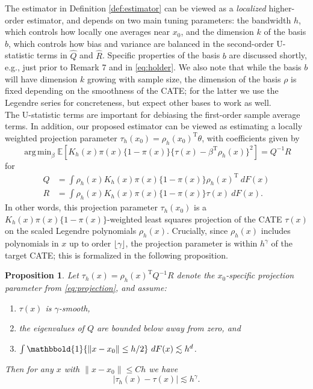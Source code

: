 \documentclass[11pt,twoside]{article}
\def\T{{ \mathrm{\scriptscriptstyle T} }}
\newcommand{\Pb}{\mathbb{P}}
\newcommand{\E}{\mathbb{E}}
\DeclareMathOperator*{\argmin}{arg\,min}
\newcommand{\one}{\mathbbold{1}}
\newtheorem{proposition}{Proposition}
\theoremstyle{definition}
\theoremstyle{remark}
\begin{document}
\bigskip

The estimator in Definition \ref{def:estimator} can be viewed as a \emph{localized} higher-order estimator, and depends on two main tuning parameters: the bandwidth $h$, which controls how locally one averages near $x_0$, and the dimension $k$ of the basis $b$, which controls how bias and variance are balanced in the second-order U-statistic terms in $\widehat{Q}$ and $\widehat{R}$. Specific properties of the basis $b$ are discussed shortly, e.g., just prior to Remark 7 and in \eqref{eq:holder}. We also note that while the basis $b$ will have dimension $k$ growing with sample size, the dimension of the basis $\rho$ is fixed depending on the smoothness of the CATE; for the latter we use the Legendre series for concreteness, but expect other bases to work as well. \\

The U-statistic terms are important for debiasing the first-order sample average terms. In addition, our proposed estimator can be viewed as estimating a locally weighted projection parameter $\tau_h(x_0) = \rho_h(x_0)^\T \theta $, with coefficients given by
\begin{equation} \label{eq:projection}
\argmin_\beta \E \left[ K_h(x) \pi(x)\{1-\pi(x)\} \Big\{ \tau(x) - \beta^\T \rho_h(x) \Big\}^2 \right] = Q^{-1} R
\end{equation}
for 
\begin{align*}
Q &= %
\int \rho_h(x) K_h(x) \pi(x) \{ 1-\pi(x)\} \rho_h(x)^\T \ dF(x)  \\
R &=  %
\int \rho_h(x) K_h(x) \pi(x) \{1-\pi(x)\} \tau(x) \ dF(x) .
\end{align*}
In other words, this projection parameter $\tau_h(x_0)$ is a $K_h(x) \pi(x)\{1-\pi(x)\}$-weighted least squares projection of the CATE $\tau(x)$ on the scaled Legendre polynomials $\rho_h(x)$. Crucially, since $\rho_h(x)$ includes polynomials in $x$ up to order $\lfloor \gamma \rfloor$,  the projection parameter is within $h^\gamma$ of the target CATE; this is formalized in the following proposition. \\


\begin{proposition} \label{prop:projbias}
Let $\tau_h(x) = \rho_h(x)^\T Q^{-1} R$ denote the $x_0$-specific projection parameter from \eqref{eq:projection}, and
assume:
\begin{enumerate}
\item $\tau(x)$ is $\gamma$-smooth,
\item the eigenvalues of $Q$ are bounded below away from zero, and
\item $\int \one\{ \|x-x_0 \| \leq h/2 \} \ dF(x) \lesssim h^d$. 
\end{enumerate}
Then for any $x$ with $\| x - x_0 \| \leq Ch$ we have
$$ | \tau_h(x) - \tau(x) | \lesssim h^\gamma . $$
\end{proposition}
\end{document}
